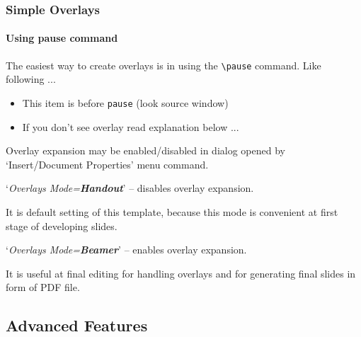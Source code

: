 \documentclass{beamer}
\begin{document}
\begin{frame}
  \frametitle{Simple Overlays}
  \framesubtitle{Using pause command}

  The easiest way to create overlays is in using 
  the \texttt{\textbackslash pause} command.
  Like following ...

  \begin{itemize}
    \item This item is before \texttt{pause} (look source window)\pause
    \item If you don't see overlay read explanation below ...
  \end{itemize}

  Overlay expansion may be enabled/disabled 
  in dialog opened by `Insert/Document Properties' menu command.

  `\textit{Overlays Mode=\textbf{Handout}}' 
   -- disables overlay expansion.

  It is default setting of this template, 
  because this mode is convenient at
  first stage of developing slides.

  `\textit{Overlays Mode=\textbf{Beamer}}' 
   -- enables overlay expansion.

  It is useful at final editing 
  for handling overlays and for generating 
  final slides in form of PDF file.

\end{frame}

\subsection{Advanced Features}
\end{document}
